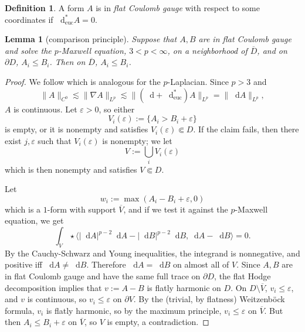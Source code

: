 \documentclass[reqno,11pt]{amsart}
\newcommand*\dif{\mathop{}\!\mathrm{d}}
\newcommand{\dfn}[1]{\emph{#1}\index{#1}}
\newcommand{\euc}{\mathrm{euc}}
\newtheorem{lemma}[theorem]{Lemma}
\theoremstyle{definition}
\newtheorem{definition}[theorem]{Definition}
\numberwithin{equation}{section}
\begin{document}
\begin{definition}
A form $A$ is in \dfn{flat Coulomb gauge} with respect to some coordinates if $\dif^*_\euc A = 0$.
\end{definition}

\begin{lemma}[comparison principle]
Suppose that $A, B$ are in flat Coulomb gauge and solve the $p$-Maxwell equation, $3 < p < \infty$, on a neighborhood of $\overline D$, and on $\partial D$, $A_i \leq B_i$.
Then on $\overline D$, $A_i \leq B_i$.
\end{lemma}
\begin{proof}
We follow \cite[Theorem 2.15]{lindqvist2019notes} which is analogous for the $p$-Laplacian.
Since $p > 3$ and
$$\|A\|_{C^0} \lesssim \|\nabla A\|_{L^p} \lesssim \|(\dif + \dif_\euc^*) A\|_{L^p} = \|\dif A\|_{L^p},$$
$A$ is continuous.
Let $\varepsilon > 0$, so either
$$V_i(\varepsilon) := \{A_i > B_i + \varepsilon\}$$
is empty, or it is nonempty and satisfies $V_i(\varepsilon) \Subset D$.
If the claim fails, then there exist $j, \varepsilon$ such that $V_i(\varepsilon)$ is nonempty; we let 
$$V := \bigcup_i V_i(\varepsilon)$$
which is then nonempty and satisfies $V \Subset D$. 

Let
$$w_i := \max(A_i - B_i + \varepsilon, 0)$$
which is a $1$-form with support $\overline V$, and if we test it against the $p$-Maxwell equation, we get
$$\int_V \star \langle |\dif A|^{p - 2} \dif A - |\dif B|^{p - 2} \dif B, \dif A - \dif B\rangle = 0.$$
By the Cauchy-Schwarz and Young inequalities, the integrand is nonnegative, and positive iff $\dif A \neq \dif B$.
Therefore $\dif A = \dif B$ on almost all of $V$.
Since $A, B$ are in flat Coulomb gauge and have the same full trace on $\partial D$, the flat Hodge decomposition implies that $v := A - B$ is flatly harmonic on $D$.
On $D \setminus \overline V$, $v_i \leq \varepsilon$, and $v$ is continuous, so $v_i \leq \varepsilon$ on $\partial V$.
By the (trivial, by flatness) Weitzenb\"ock formula, $v_i$ is flatly harmonic, so by the maximum principle, $v_i \leq \varepsilon$ on $\overline V$.
But then $A_i \leq B_i + \varepsilon$ on $\overline V$, so $V$ is empty, a contradiction.
\end{proof}
\end{document}
